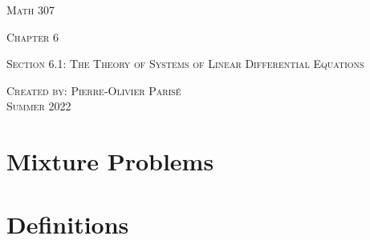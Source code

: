 \documentclass[12pt,a4paper]{article}
\begin{document}
\thispagestyle{empty}

\begin{center}
\vspace*{2.5cm}

{\Huge \textsc{Math 307}}

\vspace*{2cm}

{\LARGE \textsc{Chapter 6}} 

\vspace*{0.75cm}

\noindent\textsc{Section 6.1: The Theory of Systems of Linear Differential Equations}

\vspace*{0.75cm}

\tableofcontents

\vfill

\noindent \textsc{Created by: Pierre-Olivier Paris{\'e}} \\
\textsc{Summer 2022}
\end{center}

\newpage

\section{Mixture Problems}

\newpage

\section{Definitions}
\end{document}
